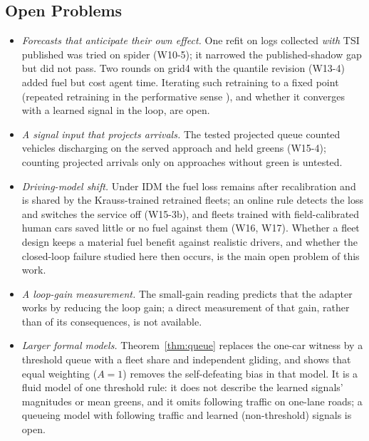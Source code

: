 \subsection{Open Problems}
\begin{itemize}\setlength\itemsep{1pt}
\item \emph{Forecasts that anticipate their own effect.} One refit on logs collected \emph{with} TSI published was tried on spider (W10-5); it
narrowed the published-shadow gap but did not pass. Two rounds on grid4 with the quantile revision (W13-4) added fuel but cost agent time. Iterating such retraining to a fixed point (repeated retraining in the performative
sense \cite{perdomo2020}), and whether it converges with a learned signal in the loop, are open.
\item \emph{A signal input that projects arrivals.} The tested projected queue counted vehicles discharging on the served approach and
held greens (W15-4); counting projected arrivals only on approaches without green is untested.
\item \emph{Driving-model shift.} Under IDM the fuel loss remains after recalibration and is shared by the Krauss-trained retrained fleets;
an online rule detects the loss and switches the service off (W15-3b), and fleets trained with field-calibrated human cars saved little or
no fuel against them (W16, W17). Whether a fleet design keeps a material fuel benefit against realistic drivers, and whether the closed-loop
failure studied here then occurs, is the main open problem of this work.
\item \emph{A loop-gain measurement.} The small-gain reading predicts that the adapter works by reducing the loop gain; a direct
measurement of that gain, rather than of its consequences, is not available.
\item \emph{Larger formal models.} Theorem~\ref{thm:queue} replaces the one-car witness by a threshold queue with a fleet share and
independent gliding, and shows that equal weighting ($A=1$) removes the self-defeating bias in that model. It is a fluid model of one threshold rule:
it does not describe the learned signals' magnitudes or mean greens, and it omits following traffic on one-lane roads; a queueing model
with following traffic and learned (non-threshold) signals is open.
\end{itemize}

